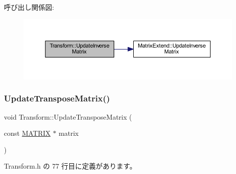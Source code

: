 呼び出し関係図\+:\nopagebreak
\begin{figure}[H]
\begin{center}
\leavevmode
\includegraphics[width=350pt]{class_transform_a3d2e5da24fb1c8015f5bb9a6c0a7a7de_cgraph}
\end{center}
\end{figure}
\mbox{\label{class_transform_a486ae5501b5081b22ee053f787e0e4a2}} 
\subsubsection{\texorpdfstring{Update\+Transpose\+Matrix()}{UpdateTransposeMatrix()}}
{\footnotesize\ttfamily void Transform\+::\+Update\+Transpose\+Matrix (\begin{DoxyParamCaption}\item[{const \mbox{\hyperlink{_vector3_d_8h_a032295cd9fb1b711757c90667278e744}{M\+A\+T\+R\+IX}} $\ast$}]{matrix }\end{DoxyParamCaption})\hspace{0.3cm}{\ttfamily [inline]}}



 Transform.\+h の 77 行目に定義があります。

